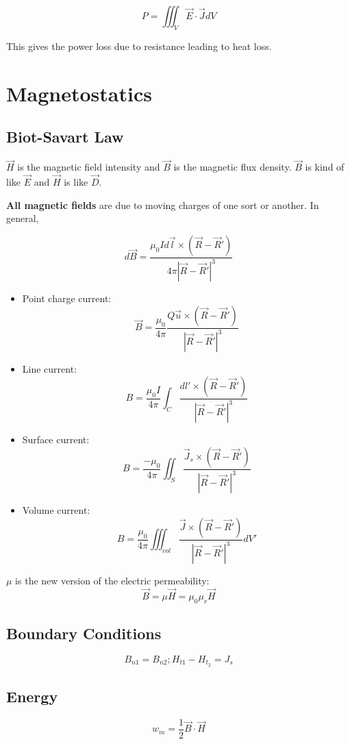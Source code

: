 \documentclass[a4paper,12pt]{report}
\begin{document}
$$P = \iiint_V \vec{E} \cdot \vec{J} dV$$

This gives the power loss due to resistance leading to heat loss.


\chapter{Magnetostatics}

\section{Biot-Savart Law} 

$\vec H$ is the magnetic field intensity and $\vec B$ is the magnetic flux density. $\vec B$ is kind of like $\vec E$ and $\vec H$ is like $\vec D$. 

\textbf{All magnetic fields} are due to moving charges of one sort or another. In general, 

$$d\vec B = \frac{\mu_0 I d\vec{l} \times (\vec R - \vec R ')}{4\pi |\vec R - \vec R'|^3}$$

\begin{itemize}
\item Point charge current: $$\vec{B} = \frac{\mu_0}{4\pi} \frac{Q\vec{u} \times (\vec R - \vec R')}{|\vec R - \vec R'|^3}$$
\item Line current: $$B = \frac{\mu_0 I}{4 \pi} \int_C \frac{dl' \times (\vec R - \vec R')}{|\vec R - \vec R'|^3}$$
\item Surface current: $$B = \frac{-\mu_0}{4\pi} \iint_S \frac{\vec J_s \times (\vec R - \vec R')}{|\vec R - \vec R'|^3}$$
\item Volume current: $$B = \frac{\mu_0}{4\pi} \iiint_{vol} \frac{\vec{J} \times (\vec R - \vec R')}{|\vec R - \vec R'|^3} dV'$$
\end{itemize}

$\mu$ is the new version of the electric permeability: $$\vec B =  \mu \vec H = \mu_0 \mu_r \vec H$$

\section{Boundary Conditions}

$$B_{n1} = B_{n2}; H_{t1} - H_{t_2} = J_s$$

\section{Energy} 

$$w_m = \frac{1}{2} \vec B \cdot \vec H$$
\end{document}
